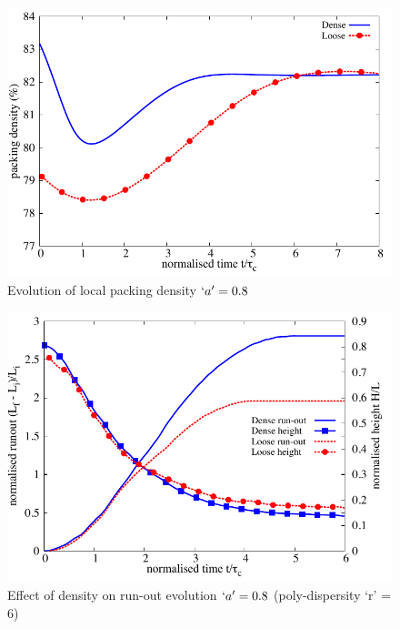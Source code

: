 \begin{figure}[tbhp]
\centering
\includegraphics[width=\textwidth]{voro_r18}
\caption{Evolution of local packing density $`a' = 0.8$}
\label{fig:voro_r18}
\end{figure}

\begin{figure}[tbhp]
\centering
\includegraphics[width=\textwidth]{runout_height_dense_r6}
\caption{Effect of density on run-out evolution $`a' = 0.8$ (poly-dispersity 
`r' = 6)}
\label{fig:runout_height_dense_r6}
\end{figure}


